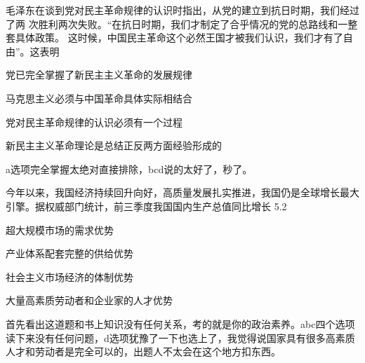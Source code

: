 \documentclass[lang=cn,newtx,10pt,scheme=chinese,pad,twocol]{zznote}
\begin{document}
\begin{exercise}毛泽东在谈到党对民主革命规律的认识时指出，从党的建立到抗日时期，我们经过了两 次胜利两次失败。“在抗日时期，我们才制定了合乎情况的党的总路线和一整套具体政策。 这时候，中国民主革命这个必然王国才被我们认识，我们才有了自由”。这表明
	\begin{choice}
		\item 党已完全掌握了新民主主义革命的发展规律
		\item 马克思主义必须与中国革命具体实际相结合
		\item 党对民主革命规律的认识必须有一个过程
		\item 新民主主义革命理论是总结正反两方面经验形成的
	\end{choice}
\end{exercise}
\begin{solution}
	a选项完全掌握太绝对直接排除，bcd说的太好了，秒了。
\end{solution}




\begin{exercise}今年以来，我国经济持续回升向好，高质量发展扎实推进，我国仍是全球增长最大 引擎。据权威部门统计，前三季度我国国内生产总值同比增长 5.2%
	\begin{choice}
		\item 超大规模市场的需求优势
		\item 产业体系配套完整的供给优势
		\item 社会主义市场经济的体制优势
		\item 大量高素质劳动者和企业家的人才优势
	\end{choice}
\end{exercise}
\begin{solution}
	首先看出这道题和书上知识没有任何关系，考的就是你的政治素养。abc四个选项读下来没有任何问题，d选项犹豫了一下也选上了，我觉得说国家具有很多高素质人才和劳动者是完全可以的，出题人不太会在这个地方扣东西。
\end{solution}
\end{document}
